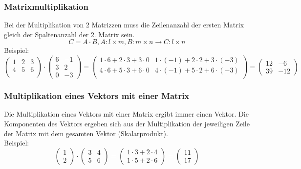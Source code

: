 \subsubsection{Matrixmultiplikation} 
\label{ssub:matrixmultiplikation}

Bei der Multiplikation von 2 Matrizzen muss die Zeilenanzahl der ersten Matrix gleich der Spaltenanzahl der 2. Matrix sein. 
\begin{equation}
	C = A \cdot B, A : l \times m, B : m \times n \rightarrow C : l \times n
\end{equation}
Beispiel: 
\begin{displaymath}
	\left(\begin{array}{ccc}1 & 2 & 3 \\4 & 5 & 6 \\\end{array}\right) \cdot
	\left(\begin{array}{cc}6 & -1 \\3 & 2 \\0 & -3\end{array}\right)
	=\left(\begin{array}{cc}1 \cdot 6  +  2 \cdot 3  +  3 \cdot 0 &
	  1 \cdot (-1) +  2 \cdot 2 +  3 \cdot (-3) \\4 \cdot 6  +  5 \cdot 3  +  6 \cdot 0 &
	  4 \cdot (-1) +  5 \cdot 2 +  6 \cdot (-3) \\\end{array}\right)
	=\left(\begin{array}{cc}12 & -6 \\39 & -12\end{array}\right)
\end{displaymath}

\subsubsection{Multiplikation eines Vektors mit einer Matrix}
\label{ssub:multiplikation_eines_vektors_mit_einer_matrix}

Die Multiplikation eines Vektors mit einer Matrix ergibt immer einen Vektor. Die Komponenten des Vektors ergeben sich
aus der Multiplikation der jeweiligen Zeile der Matrix mit dem gesamten Vektor (Skalarprodukt).
\\Beispiel:
\begin{displaymath}
	\left(\begin{array}{c}1\\2\end{array}\right) \cdot \left(\begin{array}{cc}3 & 4\\5 & 6\end{array}\right)
	= \left(\begin{array}{c}1 \cdot 3 + 2 \cdot 4 
	\\ 1 \cdot 5 + 2 \cdot 6 \end{array}\right) = \left(\begin{array}{c}11\\17\end{array}\right)
\end{displaymath}

